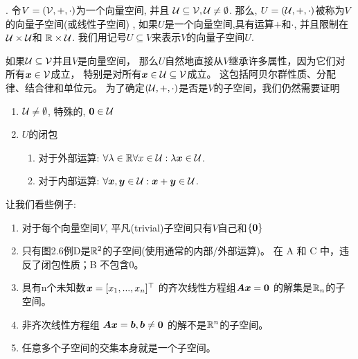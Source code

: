 \begin{definition}[向量子空间].
    令$V=(\mathcal{V},+,\cdot)$为一个向量空间, 并且
    $\mathcal{U} \subseteq \mathcal{V}, \mathcal{U} \neq \emptyset$.
    那么, $U=(\mathcal{U},+,\cdot)$被称为$V$的向量子空间(或线性子空间)
    ,
    如果$U$是一个向量空间,具有运算$+$和$\cdot$, 并且限制在
    $\mathcal{U} \times \mathcal{U}$和
    $\mathbb{R} \times \mathcal{U}$.
    我们用记号$U\subseteq V$来表示$V$的向量子空间$U$.
\end{definition}

如果$\mathcal{U}\subseteq\mathcal{V}$并且$V$是向量空间，
那么$U$自然地直接从$V$继承许多属性，因为它们对所有$\boldsymbol{x}\in \mathcal{V}$成立，
特别是对所有$\boldsymbol{x} \in \mathcal{U} \subseteq \mathcal{V}$成立。
这包括阿贝尔群性质、分配律、结合律和单位元。
为了确定$(\mathcal{U}, +, \cdot)$是否是$V$的子空间，我们仍然需要证明
\begin{enumerate}
    \item $\mathcal{U} \neq \emptyset$, 特殊的, $\boldsymbol{0} \in \mathcal{U}$
    \item $U$的闭包
    \begin{enumerate}
        \item 对于外部运算:
        $\forall \lambda \in \mathbb{R} \forall x \in \mathcal{U}:
        \lambda \boldsymbol{x} \in \mathcal{U}$.
        \item 对于内部运算:
        $\forall \boldsymbol{x}, \boldsymbol{y} \in \mathcal{U}:
        \boldsymbol{x} + \boldsymbol{y} \in \mathcal{U}$.
    \end{enumerate}
\end{enumerate}

\begin{example}
    让我们看些例子:
    \begin{enumerate}
        \item 对于每个向量空间$V$, 平凡(trivial)子空间只有$V$自己和$\{\boldsymbol{0}\}$
        \item 只有图2.6例D是$\mathbb{R}^2$的子空间(使用通常的内部/外部运算)。
              在 A 和 C 中，违反了闭包性质；B 不包含$0$。
        \item 具有n个未知数$\boldsymbol{x} = [x_1 ,..., x_n ]^\top$
              的齐次线性方程组$\boldsymbol{A}\boldsymbol{x} = \boldsymbol{0}$
              的解集是$\mathbb{R}_n$的子空间。
        \item 非齐次线性方程组
              $\boldsymbol{A}\boldsymbol{x} = \boldsymbol{b}, \boldsymbol{b} \neq \boldsymbol{0}$
              的解不是$\mathbb{R}^n$的子空间。
        \item 任意多个子空间的交集本身就是一个子空间。
   \end{enumerate}
\end{example}

